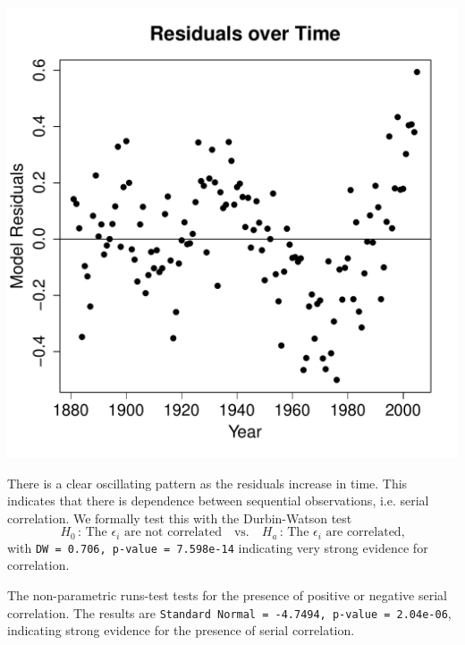 \documentclass{homework}
\begin{document}
\begin{longproblem}
\begin{minipage}{.35\textwidth}
\includegraphics[width=\textwidth]{resid4.pdf}
\end{minipage}
\begin{minipage}{.6\textwidth}
  There is a clear oscillating pattern as the residuals increase in time.  This indicates that there is dependence between sequential observations, i.e. serial correlation.  We formally test this with the Durbin-Watson test
 $$
  H_0\,:\,\text{The $\epsilon_i$ are not correlated}\quad\text{vs.}\quad H_a\,:\,\text{The $\epsilon_i$ are correlated,}
 $$
  with \texttt{DW = 0.706, p-value = 7.598e-14} indicating very strong evidence for correlation.  
\end{minipage}


  The non-parametric runs-test tests for the presence of positive or negative serial correlation.  The results are \texttt{Standard Normal = -4.7494, p-value = 2.04e-06}, indicating strong evidence for the presence of serial correlation.

\end{longproblem}
\end{document}
